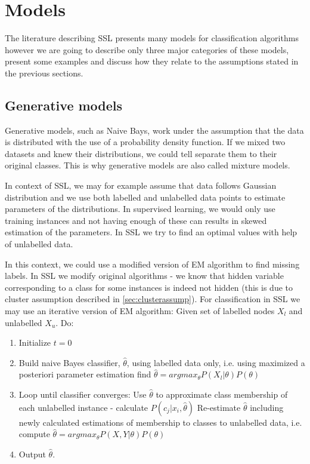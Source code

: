 \documentclass[12pt, a4paper, pdflatex]{report}
\begin{document}
\section{Models}

The literature describing SSL presents many models for classification algorithms\cite{chapelle06,Zhu06semi} however we are going to describe only three major categories of these models, present some examples and discuss how they relate to the assumptions stated in the previous sections.

\subsection{Generative models}

Generative models, such as Naive Bays, work under the assumption that the data is distributed with the use of a probability density function. If we mixed two datasets and knew their distributions, we could tell separate them to their original classes. This is why generative models are also called mixture models\cite{Zhu06semi}.

In context of SSL, we may for example assume that data follows Gaussian distribution and we use both labelled and unlabelled data points to estimate parameters of the distributions. In supervised learning, we would only use training instances and not having enough of these can results in skewed estimation of the parameters. In SSL we try to find an optimal values with help of unlabelled data.

In this context, we could use a modified version of EM algorithm to find missing labels. In SSL we modify original algorithms - we know that hidden variable corresponding to a class for some instances is indeed not hidden (this is due to cluster assumption described in \ref{sec:clusterassump})\cite{Zhu06semi, chapelle06}. For classification in SSL we may use an iterative version of EM algorithm:
\newline
Given set of labelled nodes $X_l$ and unlabelled $X_u$. Do:
\newline
\begin{enumerate}
\item Initialize $t  = 0 $
\item Build naive Bayes classifier, $ \hat{\theta}$, using labelled data only, i.e. using maximized a posteriori parameter estimation find $ \hat{\theta} = argmax_{\theta} P(X_{l} | \theta)P(\theta) $
\item Loop until classifier converges:
\subitem Use $\hat{\theta}$ to approximate class membership of each unlabelled instance - calculate $ P(c_j|x_i, \hat{\theta})$
\subitem Re-estimate $\hat{\theta}$ including newly calculated estimations of membership to classes to unlabelled data, i.e. compute $ \hat{\theta} = argmax_{\theta} P(X, Y | \theta)P(\theta) $
\item Output $\hat{\theta}$.

\end{enumerate}
\end{document}
